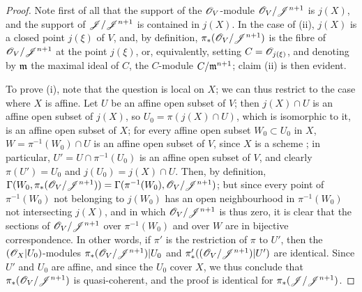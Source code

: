 \begin{proof}
\label{proof-2.8.10.1}
Note first of all that the support of the $\mathscr{O}_V$-module $\mathscr{O}_V/\mathscr{J}^{n+1}$ is $j(X)$, and the support of $\mathscr{J}/\mathscr{J}^{n+1}$ is contained in $j(X)$.
In the case of (ii), $j(X)$ is a closed point $j(\xi)$ of $V$,
and, by definition, $\pi_*(\mathscr{O}_V/\mathscr{J}^{n+1})$ is the fibre of $\mathscr{O}_V/\mathscr{J}^{n+1}$ at the point $j(\xi)$, or, equivalently, setting $C=\mathscr{O}_{j(\xi)}$, and denoting by $\mathfrak{m}$ the maximal ideal of $C$, the $C$-module $C/\mathfrak{m}^{n+1}$;
claim (ii) is then evident.

To prove (i), note that the question is local on $X$;
we can thus restrict to the case where $X$ is affine.
Let $U$ be an affine open subset of $V$;
then $j(X)\cap U$ is an affine open subset of $j(X)$, so $U_0=\pi(j(X)\cap U)$, which is isomorphic to it, is an affine open subset of $X$;
for every affine open subset $W_0\subset U_0$ in $X$, $W=\pi^{-1}(W_0)\cap U$ is an affine open subset of $V$, since $X$ is a scheme ;
in particular, $U'=U\cap\pi^{-1}(U_0)$ is an affine open subset of $V$, and clearly $\pi(U')=U_0$ and $j(U_0)=j(X)\cap U$.
Then, by definition, $\Gamma(W_0,\pi_*(\mathscr{O}_V/\mathscr{J}^{n+1})) = \Gamma(\pi^{-1}(W_0),\mathscr{O}_V/\mathscr{J}^{n+1})$;
but since every point of $\pi^{-1}(W_0)$ not belonging to $j(W_0)$ has an open neighbourhood in $\pi^{-1}(W_0)$ not intersecting $j(X)$, and in which $\mathscr{O}_V/\mathscr{J}^{n+1}$ is thus zero, it is clear that the sections of $\mathscr{O}_V/\mathscr{J}^{n+1}$ over $\pi^{-1}(W_0)$ and over $W$ are in bijective correspondence.
In other words, if $\pi'$ is the restriction of $\pi$ to $U'$, then the $(\mathscr{O}_X|U_0)$-modules $\pi_*(\mathscr{O}_V/\mathscr{J}^{n+1})|U_0$ and $\pi'_*((\mathscr{O}_V/\mathscr{J}^{n+1})|U')$ are identical.
Since $U'$ and $U_0$ are affine, and since the $U_0$ cover $X$, we thus conclude  that $\pi_*(\mathscr{O}_V/\mathscr{J}^{n+1})$ is quasi-coherent, and the proof is identical for $\pi_*(\mathscr{J}/\mathscr{J}^{n+1})$.


\end{proof}
